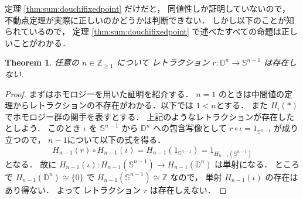 \documentclass[leqno, a4paper, 12pt]{jsarticle}
\theoremstyle{plain}
\newtheorem{thm}{Theorem}[section]
\theoremstyle{definition}
\theoremstyle{remark}
\newcommand{\zz}{\mathbb{Z}}
\newcommand{\yospfont}[1]{\mathbb{#1}}
\newcommand{\yodisc}[1]{\yospfont{D}^{#1}}
\newcommand{\yosphere}[1]{\yospfont{S}^{#1}}
\newcommand{\myhl}[2]{H_{#2}(#1)}
\newcommand{\yoidmap}[1]{1_{#1}}
\numberwithin{equation}{section}
\begin{document}
定理
\ref{thm:sum:douchifixedpoint}
だけだと，
同値性しか証明していないので，
不動点定理が実際に正しいのかどうかは判断できない．
しかし以下のことが知られているので，
定理
\ref{thm:sum:douchifixedpoint}
で述べたすべての命題は正しいことがわかる．
\begin{thm}
任意の
$n\in \zz_{\ge 1}$
について
レトラクション
$r\colon \yodisc{n}\to \yosphere{n-1}$
は存在しない.
\end{thm}
\begin{proof}
まずはホモロジーを用いた証明を紹介する．
$n=1$
のときは中間値の定理からレトラクションの不存在がわかる．以下では
$1<n$とする．
また
$\myhl{*}{i}$
でホモロジー群の関手を表すとする．
上記のようなレトラクションが存在したとしよう．
このとき
$\iota$
を
$\yosphere{n-1}$
から
$\yodisc{n}$
への包含写像として
$r\circ  \iota = \yoidmap{{\yosphere{n-1}}}$
が成り立つので，
$n-1$について以下の式を得る．
\[
\myhl{r}{n-1}\circ \myhl{\iota}{n-1}=\myhl{1_{\yosphere{n-1}}}{n-1}=\yoidmap{{\myhl{\yosphere{n-1}}{n-1}}}
\]
となる．
故に
$\myhl{\iota}{n-1}\colon \myhl{\yosphere{n-1}}{n-1}\to \myhl{\yodisc{n}}{n-1}$
は単射になる．
ところで
$\myhl{\yodisc{n}}{n-1}\cong \{0\}$
で
$\myhl{\yosphere{n-1}}{n-1}\cong\zz$
なので，
単射
$\myhl{\iota}{n-1}$
の存在はあり得ない．
よって
レトラクション
$r$
は存在しえない．
\end{proof}
\end{document}
